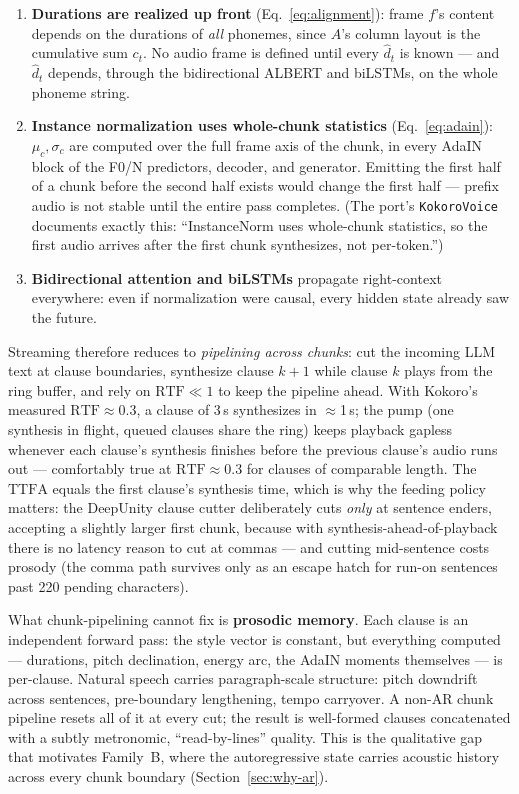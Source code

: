\documentclass[11pt,a4paper]{article}
\newcommand{\RTF}{\ensuremath{\mathrm{RTF}}}
\newcommand{\TTFA}{\ensuremath{\mathrm{TTFA}}}
\newcommand{\code}[1]{\texttt{#1}}
\begin{document}
\begin{enumerate}[leftmargin=2em]
\item \textbf{Durations are realized up front} (Eq.~\ref{eq:alignment}): frame $f$'s
content depends on the durations of \emph{all} phonemes, since $A$'s column layout is the
cumulative sum $c_t$. No audio frame is defined until every $\hat d_t$ is known --- and
$\hat d_t$ depends, through the bidirectional ALBERT and biLSTMs, on the whole phoneme
string.
\item \textbf{Instance normalization uses whole-chunk statistics}
(Eq.~\ref{eq:adain}): $\mu_c, \sigma_c$ are computed over the full frame axis of the
chunk, in every AdaIN block of the F0/N predictors, decoder, and generator. Emitting the
first half of a chunk before the second half exists would change the first half ---
prefix audio is not stable until the entire pass completes. (The port's
\code{KokoroVoice} documents exactly this: ``InstanceNorm uses whole-chunk statistics, so
the first audio arrives after the first chunk synthesizes, not per-token.'')
\item \textbf{Bidirectional attention and biLSTMs} propagate right-context everywhere:
even if normalization were causal, every hidden state already saw the future.
\end{enumerate}

Streaming therefore reduces to \emph{pipelining across chunks}: cut the incoming LLM text
at clause boundaries, synthesize clause $k{+}1$ while clause $k$ plays from the ring
buffer, and rely on $\RTF \ll 1$ to keep the pipeline ahead. With Kokoro's measured
$\RTF \approx 0.3$, a clause of 3\,s synthesizes in $\approx$1\,s; the pump
(one synthesis in flight, queued clauses share the ring) keeps playback gapless whenever
each clause's synthesis finishes before the previous clause's audio runs out ---
comfortably true at $\RTF \approx 0.3$ for clauses of comparable length. The
\TTFA{} equals the first clause's synthesis time, which is why the feeding policy
matters: the DeepUnity clause cutter deliberately cuts \emph{only} at sentence enders,
accepting a slightly larger first chunk, because with synthesis-ahead-of-playback there
is no latency reason to cut at commas --- and cutting mid-sentence costs prosody
(the comma path survives only as an escape hatch for run-on sentences past 220 pending
characters).

What chunk-pipelining cannot fix is \textbf{prosodic memory}. Each clause is an
independent forward pass: the style vector is constant, but everything computed ---
durations, pitch declination, energy arc, the AdaIN moments themselves --- is
per-clause. Natural speech carries paragraph-scale structure: pitch downdrift across
sentences, pre-boundary lengthening, tempo carryover. A non-AR chunk pipeline resets all
of it at every cut; the result is well-formed clauses concatenated with a subtly
metronomic, ``read-by-lines'' quality. This is the qualitative gap that motivates
Family~B, where the autoregressive state carries acoustic history across every chunk
boundary (Section~\ref{sec:why-ar}).
\end{document}
